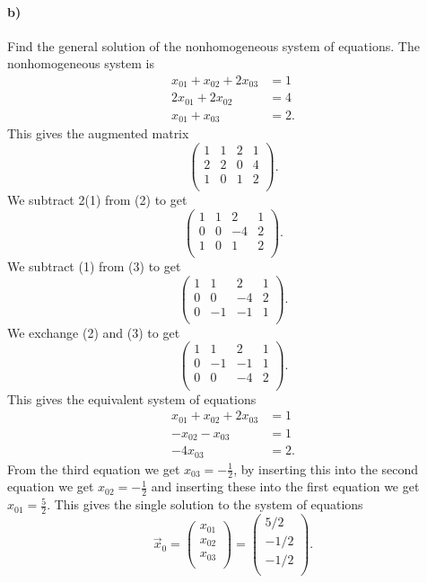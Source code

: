 \paragraph{b)} Find the general solution of the nonhomogeneous system of equations.
\bigbreak
The nonhomogeneous system is
\begin{align*}
  x_{01} + x_{02} + 2x_{03} &= 1 \\
  2x_{01} + 2x_{02} &= 4 \\
  x_{01} + x_{03} &= 2
.\end{align*}
This gives the augmented matrix
\[ 
\left( \begin{array}{ccc|c}
1 & 1 & 2 & 1\\
2 & 2 & 0 & 4\\
1 & 0 & 1 & 2\\
\end{array} \right)
.\]
We subtract 2(1) from (2) to get
\[ 
\left( \begin{array}{ccc|c}
1 & 1 & 2 & 1\\
0 & 0 & -4 & 2\\
1 & 0 & 1 & 2\\
\end{array} \right)
.\]
We subtract (1) from (3) to get
\[ 
\left( \begin{array}{ccc|c}
1 & 1 & 2 & 1\\
0 & 0 & -4 & 2\\
0 & -1 & -1 & 1\\
\end{array} \right)
.\]
We exchange (2) and (3) to get
\[ 
\left( \begin{array}{ccc|c}
1 & 1 & 2 & 1\\
0 & -1 & -1 & 1\\
0 & 0 & -4 & 2\\
\end{array} \right)
.\]
This gives the equivalent system of equations
\begin{align*}
  x_{01} + x_{02} + 2x_{03} &= 1 \\
  -x_{02} - x_{03} &= 1 \\
  -4x_{03} &= 2
.\end{align*}
From the third equation we get $x_{03} = -\frac{1}{2}$, by inserting this into the second equation we get $x_{02} = -\frac{1}{2}$ and inserting these into the first equation we get $x_{01} = \frac{5}{2}$. This gives the single solution to the system of equations
\[ 
\Vec{x}_0 = \begin{pmatrix}
x_{01}\\
x_{02}\\
x_{03}\\
\end{pmatrix} = \begin{pmatrix}
5 / 2\\
-1 / 2\\
-1 / 2\\
\end{pmatrix}
.\]
